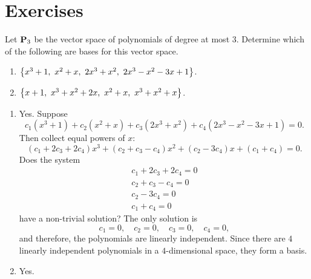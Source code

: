 \section*{Exercises}

\begin{ex}
  Let $\mathbf{P}_3$ be the vector space of polynomials of degree at most
  3. Determine which of the following are bases for this vector space.

  \begin{enumerate}
  \item $\left\{x^3+1,~x^2+x,~2x^3+x^2,~2x^3-x^2-3x+1\right\}$.
  \item $\left\{x+1,~x^3+x^2+2x,~x^2+x,~x^3+x^2+x\right\}$.
  \end{enumerate}

  \begin{sol}
    \begin{enumerate}
    \item
      Yes. Suppose
      \begin{equation*}
        c_1(x^3+1) + c_2(x^2+x) + c_3(2x^3+x^2) +
        c_4(2x^3-x^2-3x+1) = 0.
      \end{equation*}
      Then collect equal powers of $x$:
      \begin{equation*}
        (c_1+2c_3+2c_4)x^3 + (c_2+c_3-c_4)x^2 +
        (c_2-3c_4)x + (c_1+c_4) = 0.
      \end{equation*}
      Does the system
      \begin{equation*}
        \begin{array}{c}
          c_1 + 2c_3 + 2c_4 = 0 \\
          c_2 + c_3 - c_4 = 0 \\
          c_2 - 3c_4 = 0 \\
          c_1 + c_4 = 0
        \end{array}
      \end{equation*}
      have a non-trivial solution? The only solution is
      \begin{equation*}
        c_1 = 0,\quad
        c_2 = 0,\quad
        c_3 = 0,\quad
        c_4 = 0,
      \end{equation*}
      and therefore, the polynomials are linearly independent. Since
      there are $4$ linearly independent polynomials in a
      $4$-dimensional space, they form a basis.
    \item Yes.
    \end{enumerate}
  \end{sol}
\end{ex}

